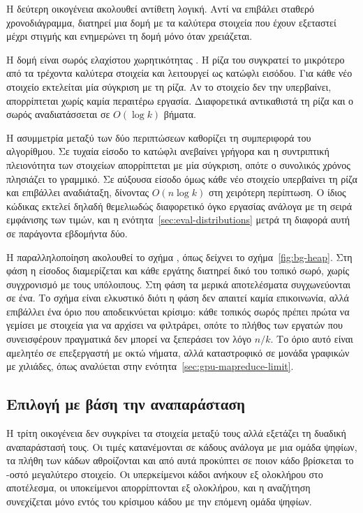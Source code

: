 Η δεύτερη οικογένεια ακολουθεί αντίθετη λογική. Αντί να επιβάλει σταθερό
χρονοδιάγραμμα, διατηρεί μια δομή με τα  καλύτερα στοιχεία που έχουν
εξεταστεί μέχρι στιγμής και ενημερώνει τη δομή μόνο όταν χρειάζεται.

Η δομή είναι σωρός ελαχίστου χωρητικότητας . Η ρίζα του συγκρατεί το
μικρότερο από τα  τρέχοντα καλύτερα στοιχεία και λειτουργεί ως κατώφλι
εισόδου. Για κάθε νέο στοιχείο εκτελείται μία σύγκριση με τη ρίζα. Αν το στοιχείο
δεν την υπερβαίνει, απορρίπτεται χωρίς καμία περαιτέρω εργασία. Διαφορετικά
αντικαθιστά τη ρίζα και ο σωρός αναδιατάσσεται σε $O(\log k)$ βήματα.

Η ασυμμετρία μεταξύ των δύο περιπτώσεων καθορίζει τη συμπεριφορά του αλγορίθμου.
Σε τυχαία είσοδο το κατώφλι ανεβαίνει γρήγορα και η συντριπτική πλειονότητα των
στοιχείων απορρίπτεται με μία σύγκριση, οπότε ο συνολικός χρόνος πλησιάζει το
γραμμικό. Σε αύξουσα είσοδο όμως κάθε νέο στοιχείο υπερβαίνει τη ρίζα και
επιβάλλει αναδιάταξη, δίνοντας $O(n \log k)$ στη χειρότερη περίπτωση. Ο ίδιος
κώδικας εκτελεί δηλαδή θεμελιωδώς διαφορετικό όγκο εργασίας ανάλογα με τη σειρά
εμφάνισης των τιμών, και η ενότητα~\ref{sec:eval-distributions} μετρά τη διαφορά
αυτή σε παράγοντα εβδομήντα δύο.

Η παραλληλοποίηση ακολουθεί το σχήμα , όπως δείχνει το
σχήμα~\ref{fig:bg-heap}. Στη φάση  η είσοδος
διαμερίζεται και κάθε εργάτης διατηρεί δικό του τοπικό σωρό, χωρίς συγχρονισμό με
τους υπόλοιπους. Στη φάση  τα μερικά αποτελέσματα συγχωνεύονται σε
ένα. Το σχήμα είναι ελκυστικό διότι η φάση  δεν απαιτεί καμία επικοινωνία,
αλλά επιβάλλει ένα όριο που αποδεικνύεται κρίσιμο: κάθε τοπικός σωρός πρέπει
πρώτα να γεμίσει με  στοιχεία για να αρχίσει να φιλτράρει, οπότε το πλήθος
των εργατών που συνεισφέρουν πραγματικά δεν μπορεί να ξεπεράσει τον λόγο $n/k$.
Το όριο αυτό είναι αμελητέο σε επεξεργαστή με οκτώ νήματα, αλλά καταστροφικό σε
μονάδα γραφικών με χιλιάδες, όπως αναλύεται στην
ενότητα~\ref{sec:gpu-mapreduce-limit}.



\subsection{Επιλογή με βάση την αναπαράσταση}
\label{sec:bg-radix}

Η τρίτη οικογένεια δεν συγκρίνει τα στοιχεία μεταξύ τους αλλά εξετάζει τη δυαδική
αναπαράστασή τους. Οι τιμές κατανέμονται σε κάδους ανάλογα με μια ομάδα ψηφίων,
τα πλήθη των κάδων αθροίζονται και από αυτά προκύπτει σε ποιον κάδο βρίσκεται το
-οστό μεγαλύτερο στοιχείο. Οι υπερκείμενοι κάδοι ανήκουν εξ ολοκλήρου στο
αποτέλεσμα, οι υποκείμενοι απορρίπτονται εξ ολοκλήρου, και η αναζήτηση συνεχίζεται
μόνο εντός του κρίσιμου κάδου με την επόμενη ομάδα ψηφίων.

